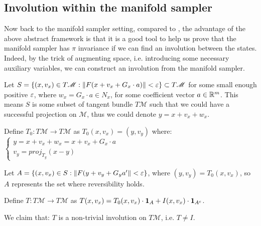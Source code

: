 \documentclass{article}
\begin{document}
\subsection{Involution within the manifold sampler}
Now back to the manifold sampler setting, compared to \cite{manifoldparent}, the advantage of the above abstract framework is that it is a good tool to help us prove that the manifold sampler has $\pi$ invariance if we can find an involution between the states. Indeed, by the trick of augmenting space, i.e. introducing some necessary auxiliary variables, we can construct an involution from the manifold sampler.

Let $S = \{(x, v_x) \in T\mathscr{M} : \left\lVert F(x + v_x + G_x \cdot a)\right\rVert < \varepsilon\} \subset T\mathscr{M}$ for some small enough positive $\varepsilon$, where $w_x = G_x \cdot a \in N_x$, for some coefficient vector $a \in \mathbb R^m$. This means $S$ is some subset of tangent bundle $T\mathscr{M}$ such that we could have a successful projection on $\mathscr{M}$, thus we could denote $y = x + v_x + w_x$. 

Define $T_0: T\mathscr{M} \to T\mathscr{M}$ as $T_0(x, v_x) = (y, v_y)$ 
where:
$\begin{cases}
y =  x + v_x + w_x = x + v_x + G_x \cdot a\\
v_y = \textit{proj}_{T_y}(x-y)
\end{cases}$

Let $A = \{(x, v_x) \in S : \left\lVert F(y + v_y + G_y a'\right\rVert < \varepsilon\}$, where $(y, v_y) = T_0(x, v_x)$, so $A$ represents the set where reversibility holds.

Define $T: T\mathscr{M} \to T\mathscr{M}$ as $T(x, v_x) = T_0(x, v_x) \cdot {\mathbf 1}_A + I(x, v_x) \cdot {\mathbf 1}_{A^c}$.

We claim that: $T$ is a non-trivial involution on $T\mathscr{M}$, i.e. $T \neq I$.
\end{document}
